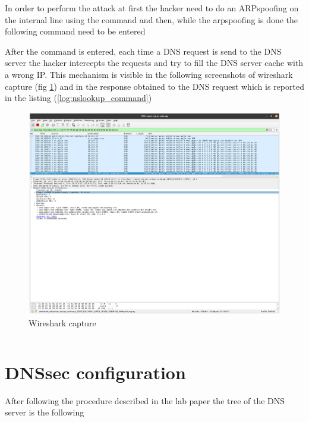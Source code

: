 In order to perform the attack at first the hacker need to do an ARPspoofing on the internal line using the command  and  then, while the arpspoofing is done the following command need to be entered 

After the command is entered, each time a DNS request is send to the DNS server the hacker intercepts the requests and try to fill the DNS server cache with a wrong IP. This mechanism is visible in the following screenshots of wireshark capture (fig \ref{fig:Wireshark_capture}) and in the response obtained to the DNS request which is reported in the listing (\ref{log:nslookup_command})

\begin{figure}[H]
	\centering
	\includegraphics[width=\linewidth]{images/cache_poisoning_wireshark_log.png}
	\caption{Wireshark capture}
	\label{fig:Wireshark_capture}
\end{figure}

\inputminted{text}{cachepoisoning_loca_log.txt}
\label{log:nslookup_command}


\section{DNSsec configuration}
After following the procedure described in the lab paper the tree of the DNS server is the following

